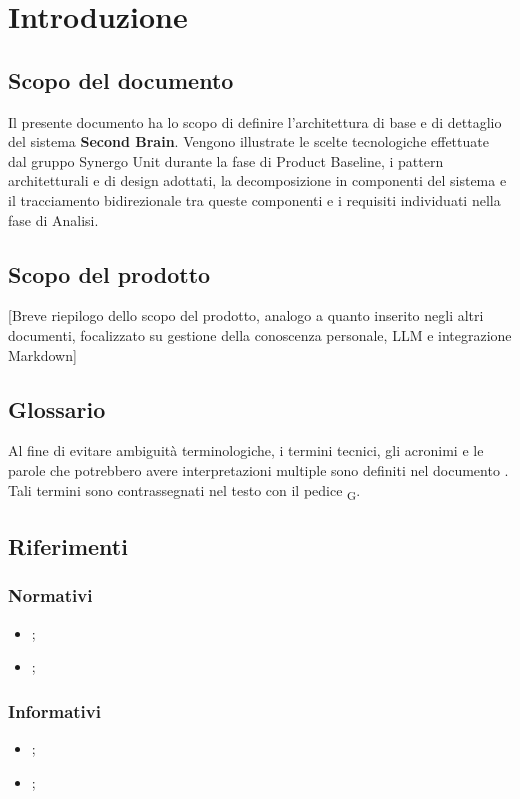 \section{Introduzione}

\subsection{Scopo del documento}
Il presente documento ha lo scopo di definire l'architettura di base e di dettaglio del sistema \textbf{Second Brain}. Vengono illustrate le scelte tecnologiche effettuate dal gruppo Synergo Unit durante la fase di Product Baseline, i pattern architetturali e di design adottati, la decomposizione in componenti del sistema e il tracciamento bidirezionale tra queste componenti e i requisiti individuati nella fase di Analisi.

\subsection{Scopo del prodotto}
[Breve riepilogo dello scopo del prodotto, analogo a quanto inserito negli altri documenti, focalizzato su gestione della conoscenza personale, LLM e integrazione Markdown]

\subsection{Glossario}
Al fine di evitare ambiguità terminologiche, i termini tecnici, gli acronimi e le parole che potrebbero avere interpretazioni multiple sono definiti nel documento . Tali termini sono contrassegnati nel testo con il pedice \textsubscript{G}.

\subsection{Riferimenti}

\subsubsection{Normativi}
\begin{itemize}
	\item {};
	\item {};
\end{itemize}

\subsubsection{Informativi}
\begin{itemize}
	\item {};
	\item {};
\end{itemize}